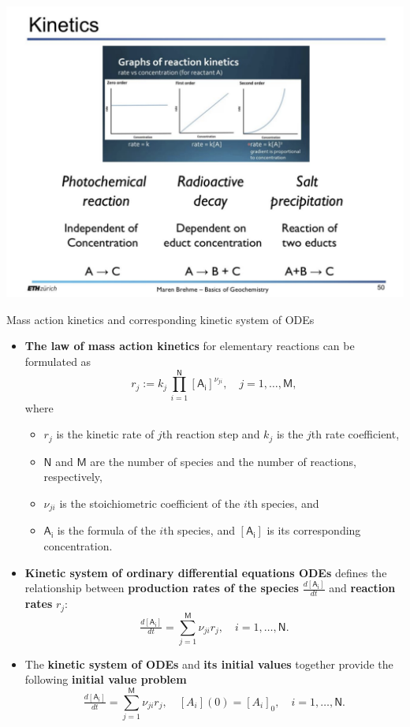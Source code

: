 \begin{frame}
\centering
\includegraphics[height=0.6\textwidth]{figures/chemical-kinetics/maren-brener-slide.png}

\end{frame}
%
\begin{frame}{Mass action kinetics and corresponding kinetic system of ODEs}
	\footnotesize
	\begin{itemize}
		\item \alert{\bf The law of mass action kinetics} for elementary reactions can be formulated as
		\[r_j := k_j \, \prod_{i=1}^{\mathsf{N}} \mathsf{[A_i]}^{\nu_{ji}}, \quad j = 1, \ldots, \mathsf{M}, \]
		\vskip -10pt
		where 
		\begin{itemize}
			\item $r_j $ is the kinetic rate of $j$th reaction step and $k_j$ is the $j$th rate coefficient, 
			\item $\mathsf{N}$ and $\mathsf{M}$ are the number of species and  the number of reactions, respectively, 
			\item $\nu_{ji}$ is the stoichiometric coefficient of the $i$th species, and 
			\item  $\mathsf{A_i}$ is the formula of the $i$th species, and $[\mathsf{A_i}]$ is its corresponding concentration.
		\end{itemize} 
	\pause
	\item \alert{\bf Kinetic system of ordinary differential equations ODEs} defines the relationship between 
	{\bf production rates of the species} $\tfrac{d \mathsf{[A_i]}}{dt}$ and {\bf reaction rates} $r_j$:
	\[
	\tfrac{d \mathsf{[A_i]}}{dt} = \sum_{j=1}^{\mathsf{M}} \nu_{ji} r_j, \quad i = 1, \ldots, \mathsf{N}.
	\]
	\vskip -5pt
	\pause
	\item The {\bf kinetic system of ODEs} and {\bf its initial values} together provide the following
	\alert{\bf initial value problem}
	\[
	\tfrac{d \mathsf{[A_i]}}{dt} = \sum_{j=1}^{\mathsf{M}} \nu_{ji} r_j, 
	\quad [A_i](0) = [A_i]_0,
	\quad i = 1, \ldots, \mathsf{N}.
	\]
	\end{itemize}
\end{frame}
